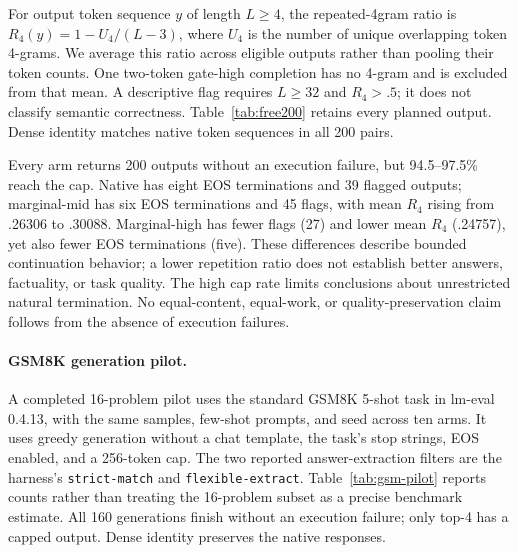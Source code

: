 \documentclass[10pt,twocolumn]{article}
\begin{document}
For output token sequence $y$ of length $L\ge4$, the repeated-4gram ratio is $R_4(y)=1-U_4/(L-3)$, where $U_4$ is the number of unique overlapping token 4-grams. We average this ratio across eligible outputs rather than pooling their token counts. One two-token gate-high completion has no 4-gram and is excluded from that mean. A descriptive flag requires $L\ge32$ and $R_4>.5$; it does not classify semantic correctness. Table~\ref{tab:free200} retains every planned output. Dense identity matches native token sequences in all 200 pairs.

Every arm returns 200 outputs without an execution failure, but 94.5--97.5\% reach the cap. Native has eight EOS terminations and 39 flagged outputs; marginal-mid has six EOS terminations and 45 flags, with mean $R_4$ rising from .26306 to .30088. Marginal-high has fewer flags (27) and lower mean $R_4$ (.24757), yet also fewer EOS terminations (five). These differences describe bounded continuation behavior; a lower repetition ratio does not establish better answers, factuality, or task quality. The high cap rate limits conclusions about unrestricted natural termination. No equal-content, equal-work, or quality-preservation claim follows from the absence of execution failures.

\paragraph{GSM8K generation pilot.}
A completed 16-problem pilot uses the standard GSM8K 5-shot task in lm-eval 0.4.13, with the same samples, few-shot prompts, and seed across ten arms. It uses greedy generation without a chat template, the task's stop strings, EOS enabled, and a 256-token cap. The two reported answer-extraction filters are the harness's \texttt{strict-match} and \texttt{flexible-extract}. Table~\ref{tab:gsm-pilot} reports counts rather than treating the 16-problem subset as a precise benchmark estimate. All 160 generations finish without an execution failure; only top-4 has a capped output. Dense identity preserves the native responses.
\end{document}
